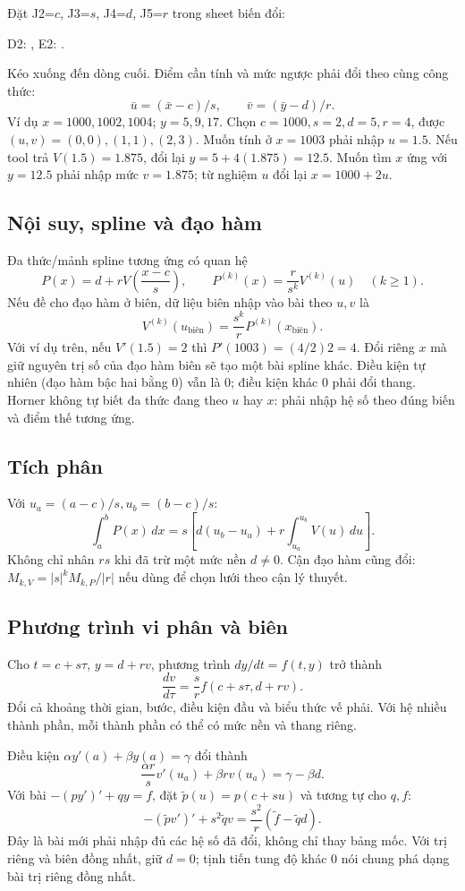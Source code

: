 \documentclass[11pt,a4paper]{article}
\newcommand{\xl}[1]{{\ttfamily\small\detokenize{#1}}}
\begin{document}
Đặt J2=$c$, J3=$s$, J4=$d$, J5=$r$ trong sheet biến đổi:
\begin{center}
D2: \xl{=(B2-$J$2)/$J$3},\quad
E2: \xl{=(C2-$J$4)/$J$5}.
\end{center}
Kéo xuống đến dòng cuối. Điểm cần tính và mức ngược phải đổi theo cùng công thức:
\[
\bar u=(\bar x-c)/s,\qquad \bar v=(\bar y-d)/r.
\]
Ví dụ $x=1000,1002,1004$; $y=5,9,17$. Chọn $c=1000,s=2,d=5,r=4$,
được $(u,v)=(0,0),(1,1),(2,3)$. Muốn tính ở $x=1003$ phải nhập $u=1.5$.
Nếu tool trả $V(1.5)=1.875$, đổi lại $y=5+4(1.875)=12.5$.
Muốn tìm $x$ ứng với $y=12.5$ phải nhập mức $v=1.875$; từ nghiệm $u$ đổi lại $x=1000+2u$.

\subsection{Nội suy, spline và đạo hàm}
Đa thức/mảnh spline tương ứng có quan hệ
\[
P(x)=d+rV\left(\frac{x-c}{s}\right),\qquad
P^{(k)}(x)=\frac{r}{s^k}V^{(k)}(u)\quad(k\ge1).
\]
Nếu đề cho đạo hàm ở biên, dữ liệu biên nhập vào bài theo $u,v$ là
\[
V^{(k)}(u_\text{biên})=\frac{s^k}{r}P^{(k)}(x_\text{biên}).
\]
Với ví dụ trên, nếu $V'(1.5)=2$ thì $P'(1003)=(4/2)2=4$.
Đổi riêng $x$ mà giữ nguyên trị số của đạo hàm biên sẽ tạo một bài spline khác.
Điều kiện tự nhiên (đạo hàm bậc hai bằng 0) vẫn là 0; điều kiện khác 0 phải đổi thang.
Horner không tự biết đa thức đang theo $u$ hay $x$: phải nhập hệ số theo đúng biến và điểm thế tương ứng.

\subsection{Tích phân}
Với $u_a=(a-c)/s,u_b=(b-c)/s$:
\[
\int_a^b P(x)\,dx=s\left[d(u_b-u_a)+r\int_{u_a}^{u_b}V(u)\,du\right].
\]
Không chỉ nhân $rs$ khi đã trừ một mức nền $d\ne0$.
Cận đạo hàm cũng đổi: $M_{k,V}=|s|^kM_{k,P}/|r|$ nếu dùng để chọn lưới theo cận lý thuyết.

\subsection{Phương trình vi phân và biên}
Cho $t=c+s\tau$, $y=d+rv$, phương trình $dy/dt=f(t,y)$ trở thành
\[
\frac{dv}{d\tau}=\frac{s}{r}f(c+s\tau,d+rv).
\]
Đổi cả khoảng thời gian, bước, điều kiện đầu và biểu thức vế phải. Với hệ nhiều thành phần, mỗi thành phần có thể có mức nền và thang riêng.

Điều kiện $\alpha y'(a)+\beta y(a)=\gamma$ đổi thành
\[
\frac{\alpha r}{s}v'(u_a)+\beta r v(u_a)=\gamma-\beta d.
\]
Với bài $-(p y')'+qy=f$, đặt $\widetilde p(u)=p(c+su)$ và tương tự cho $q,f$:
\[
-(\widetilde p v')'+s^2\widetilde q v
=\frac{s^2}{r}(\widetilde f-\widetilde q d).
\]
Đây là bài mới phải nhập đủ các hệ số đã đổi, không chỉ thay bảng mốc.
Với trị riêng và biên đồng nhất, giữ $d=0$; tịnh tiến tung độ khác 0 nói chung phá dạng bài trị riêng đồng nhất.
\end{document}
